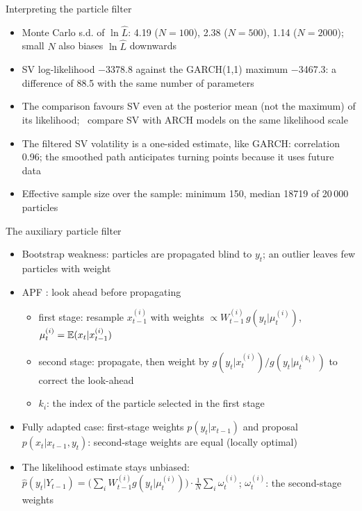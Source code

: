 \begin{frame}{Interpreting the particle filter}
\itemsize{\footnotesize}
\begin{itemize}
    \item Monte Carlo s.d. of $\ln\hat L$: 4.19 ($N = 100$), 2.38 ($N = 500$), 1.14 ($N = 2000$); small $N$ also biases $\ln\hat L$ downwards
    \item SV log-likelihood \ensuremath{-}3378.8 against the GARCH(1,1) maximum \ensuremath{-}3467.3: a difference of 88.5 with the same number of parameters
    \item The comparison favours SV even at the posterior mean (not the maximum) of its likelihood; \ compare SV with ARCH models on the same likelihood scale
    \item The filtered SV volatility is a one-sided estimate, like GARCH: correlation 0.96; the smoothed path anticipates turning points because it uses future data
    \item Effective sample size over the sample: minimum 150, median 18719 of 20\,000 particles
\end{itemize}
\end{frame}

\begin{frame}{The auxiliary particle filter}
\itemsize{\small}
\begin{itemize}
    \item Bootstrap weakness: particles are propagated blind to $y_t$; an outlier leaves few particles with weight
    \item APF : look ahead before propagating
    \begin{itemize}
        \item first stage: resample $x^{(i)}_{t-1}$ with weights $\propto W^{(i)}_{t-1}\,g(y_t | \mu^{(i)}_t)$, $\mu^{(i)}_t = \mathbb{E}(x_t | x^{(i)}_{t-1})$
        \item second stage: propagate, then weight by $g(y_t | x^{(i)}_t)/g(y_t | \mu^{(k_i)}_t)$ to correct the look-ahead
        \item $k_i$: the index of the particle selected in the first stage
    \end{itemize}
    \item Fully adapted case: first-stage weights $p(y_t | x_{t-1})$ and proposal $p(x_t | x_{t-1}, y_t)$: second-stage weights are equal (locally optimal)
    \item The likelihood estimate stays unbiased: $\hat p(y_t | Y_{t-1}) = \big(\sum_iW^{(i)}_{t-1}g(y_t | \mu^{(i)}_t)\big)\cdot\frac1N\sum_i\omega^{(i)}_t$; $\omega^{(i)}_t$: the second-stage weights
\end{itemize}
\end{frame}

